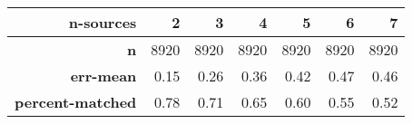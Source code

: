 \begin{tabular}{rrrrrrr}
\toprule
\textbf{n-sources} &    2 &    3 &    4 &    5 &    6 &    7 \\
\midrule
\textbf{n              } & 8920 & 8920 & 8920 & 8920 & 8920 & 8920 \\
\textbf{err-mean       } & 0.15 & 0.26 & 0.36 & 0.42 & 0.47 & 0.46 \\
\textbf{percent-matched} & 0.78 & 0.71 & 0.65 & 0.60 & 0.55 & 0.52 \\
\bottomrule
\end{tabular}
